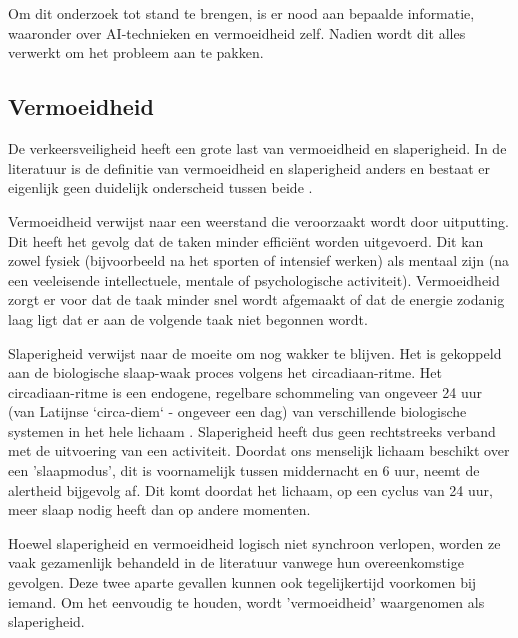 \chapter{}%
\label{ch:stand-van-zaken}


Om dit onderzoek tot stand te brengen, is er nood aan bepaalde informatie, waaronder over AI-technieken en vermoeidheid zelf. Nadien wordt dit alles verwerkt om het probleem aan te pakken.

\section{Vermoeidheid}
De verkeersveiligheid heeft een grote last van vermoeidheid en slaperigheid. In de literatuur is de definitie van vermoeidheid en slaperigheid anders en bestaat er eigenlijk geen duidelijk onderscheid tussen beide \autocite{RiguelleGoldenbeld}.

Vermoeidheid verwijst naar een weerstand die veroorzaakt wordt door uitputting. Dit heeft het gevolg dat de taken minder efficiënt worden uitgevoerd. Dit kan zowel fysiek (bijvoorbeeld na het sporten of intensief werken) als mentaal zijn (na een veeleisende intellectuele, mentale of psychologische activiteit). Vermoeidheid zorgt er voor dat de taak minder snel wordt afgemaakt of dat de energie zodanig laag ligt dat er aan de volgende taak niet begonnen wordt.

Slaperigheid verwijst naar de moeite om nog wakker te blijven. Het is gekoppeld aan de biologische slaap-waak proces volgens het circadiaan-ritme. Het circadiaan-ritme is een endogene, regelbare schommeling van ongeveer 24 uur (van Latijnse `circa-diem` - ongeveer een dag) van verschillende biologische systemen in het hele lichaam \autocite{Gianni2018}. Slaperigheid heeft dus geen rechtstreeks verband met de uitvoering van een activiteit. Doordat ons menselijk lichaam beschikt over een 'slaapmodus', dit is voornamelijk tussen middernacht en 6 uur, neemt de alertheid bijgevolg af. Dit komt doordat het lichaam, op een cyclus van 24 uur, meer slaap nodig heeft dan op andere momenten.

Hoewel slaperigheid en vermoeidheid logisch niet synchroon verlopen, worden ze vaak gezamenlijk behandeld in de literatuur vanwege hun overeenkomstige gevolgen. Deze twee aparte gevallen kunnen ook tegelijkertijd voorkomen bij iemand. Om het eenvoudig te houden, wordt 'vermoeidheid' waargenomen als slaperigheid.

